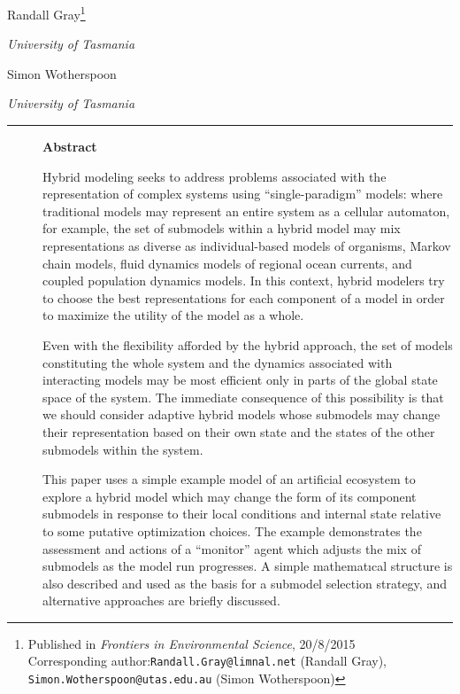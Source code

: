 \begin{center}
  Randall Gray\footnote{{Published in \emph{Frontiers in Environmental Science}, 20/8/2015}\\
    Corresponding author:\texttt{Randall.Gray@limnal.net} (Randall Gray),\\
      \texttt{Simon.Wotherspoon@utas.edu.au} (Simon Wotherspoon)
      }

    \emph{University of Tasmania}

    Simon Wotherspoon 

    \emph{University of Tasmania}
\end{center}

\rule{\textwidth}{2pt}

\begin{description}
  \item[ ]
    \textbf{Abstract}

     Hybrid modeling seeks to address problems associated with the
     rep\-re\-sen\-ta\-tion of complex systems using ``single-paradigm'' models:
     where traditional models may represent an entire system as a
     cellular automaton, for example, the set of submodels within a hybrid
     model may mix rep\-re\-sen\-ta\-tions as diverse as in\-di\-vidu\-al-based models
     of organisms, Markov chain models, fluid dynamics models of regional
     ocean currents, and coupled population dynamics models. In this
     context, hybrid modelers try to choose the best rep\-re\-sen\-ta\-tions for
     each component of a model in order to maximize the utility of the
     model as a whole.

     Even with the flexibility afforded by the hybrid approach, the set
     of models constituting the whole system and the dynamics associated
     with interacting models may be most efficient only in parts of the
     global state space of the system.  The immediate consequence of this
     possibility is that we should consider adaptive hybrid models whose
     submodels may change their rep\-re\-sen\-ta\-tion based on their own
     state and the states of the other sub\-models within the system.

     This paper uses a simple example model of an artificial ecosystem to
     explore a hybrid model which may change the form of its component
     sub\-models in response to their local conditions and internal state
     relative to some putative optimization choices.  The example
     demonstrates the assessment and actions of a ``monitor'' agent which
     adjusts the mix of sub\-models as the model run progresses.  A simple
     math\-e\-mat\-\i\-cal structure is also described and used as the basis for a
     sub\-model selection strategy, and alternative approaches are briefly
     discussed.
\end{description}

